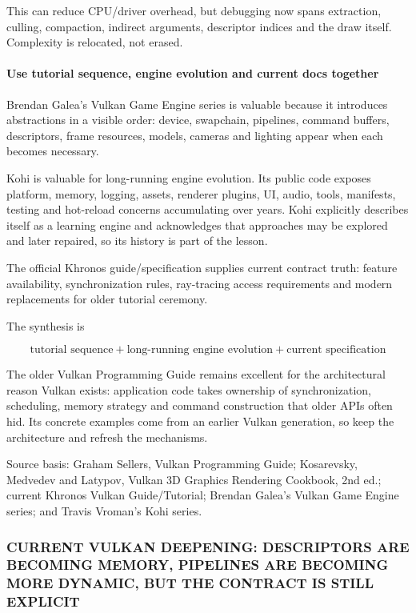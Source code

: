 This can reduce CPU/driver overhead, but debugging now spans extraction, culling, compaction, indirect arguments, descriptor indices and the draw itself. Complexity is relocated, not erased.

\paragraph{Use tutorial sequence, engine evolution and current docs together}\label{use-tutorial-sequence-engine-evolution-and-current-docs-together}

Brendan Galea's Vulkan Game Engine series is valuable because it introduces abstractions in a visible order: device, swapchain, pipelines, command buffers, descriptors, frame resources, models, cameras and lighting appear when each becomes necessary.

Kohi is valuable for long-running engine evolution. Its public code exposes platform, memory, logging, assets, renderer plugins, UI, audio, tools, manifests, testing and hot-reload concerns accumulating over years. Kohi explicitly describes itself as a learning engine and acknowledges that approaches may be explored and later repaired, so its history is part of the lesson.

The official Khronos guide/specification supplies current contract truth: feature availability, synchronization rules, ray-tracing access requirements and modern replacements for older tutorial ceremony.

The synthesis is

\[
\boxed{
\text{tutorial sequence}
+
\text{long-running engine evolution}
+
\text{current specification}
}
\]

The older Vulkan Programming Guide remains excellent for the architectural reason Vulkan exists: application code takes ownership of synchronization, scheduling, memory strategy and command construction that older APIs often hid. Its concrete examples come from an earlier Vulkan generation, so keep the architecture and refresh the mechanisms.

Source basis: Graham Sellers, Vulkan Programming Guide; Kosarevsky, Medvedev and Latypov, Vulkan 3D Graphics Rendering Cookbook, 2nd ed.; current Khronos Vulkan Guide/Tutorial; Brendan Galea's Vulkan Game Engine series; and Travis Vroman's Kohi series.

\subsubsection{CURRENT VULKAN DEEPENING: DESCRIPTORS ARE BECOMING MEMORY, PIPELINES ARE BECOMING MORE DYNAMIC, BUT THE CONTRACT IS STILL EXPLICIT}\label{current-vulkan-deepening-descriptors-are-becoming-memory-pipelines-are-becoming-more-dynamic-but-the-contract-is-still-explicit}

